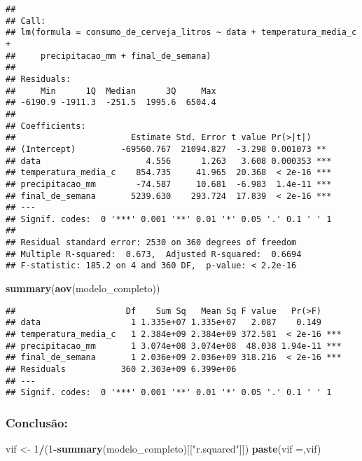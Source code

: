 \documentclass[
]{article}
\newenvironment{Shaded}{\begin{snugshade}}{\end{snugshade}}
\newcommand{\DecValTok}[1]{\textcolor[rgb]{0.00,0.00,0.81}{#1}}
\newcommand{\FunctionTok}[1]{\textcolor[rgb]{0.13,0.29,0.53}{\textbf{#1}}}
\newcommand{\NormalTok}[1]{#1}
\newcommand{\OtherTok}[1]{\textcolor[rgb]{0.56,0.35,0.01}{#1}}
\newcommand{\SpecialCharTok}[1]{\textcolor[rgb]{0.81,0.36,0.00}{\textbf{#1}}}
\newcommand{\StringTok}[1]{\textcolor[rgb]{0.31,0.60,0.02}{#1}}
\begin{document}
\begin{verbatim}
## 
## Call:
## lm(formula = consumo_de_cerveja_litros ~ data + temperatura_media_c + 
##     precipitacao_mm + final_de_semana)
## 
## Residuals:
##     Min      1Q  Median      3Q     Max 
## -6190.9 -1911.3  -251.5  1995.6  6504.4 
## 
## Coefficients:
##                       Estimate Std. Error t value Pr(>|t|)    
## (Intercept)         -69560.767  21094.827  -3.298 0.001073 ** 
## data                     4.556      1.263   3.608 0.000353 ***
## temperatura_media_c    854.735     41.965  20.368  < 2e-16 ***
## precipitacao_mm        -74.587     10.681  -6.983  1.4e-11 ***
## final_de_semana       5239.630    293.724  17.839  < 2e-16 ***
## ---
## Signif. codes:  0 '***' 0.001 '**' 0.01 '*' 0.05 '.' 0.1 ' ' 1
## 
## Residual standard error: 2530 on 360 degrees of freedom
## Multiple R-squared:  0.673,  Adjusted R-squared:  0.6694 
## F-statistic: 185.2 on 4 and 360 DF,  p-value: < 2.2e-16
\end{verbatim}

\begin{Shaded}
\begin{Highlighting}[]
\FunctionTok{summary}\NormalTok{(}\FunctionTok{aov}\NormalTok{(modelo\_completo))}
\end{Highlighting}
\end{Shaded}

\begin{verbatim}
##                      Df    Sum Sq   Mean Sq F value   Pr(>F)    
## data                  1 1.335e+07 1.335e+07   2.087    0.149    
## temperatura_media_c   1 2.384e+09 2.384e+09 372.581  < 2e-16 ***
## precipitacao_mm       1 3.074e+08 3.074e+08  48.038 1.94e-11 ***
## final_de_semana       1 2.036e+09 2.036e+09 318.216  < 2e-16 ***
## Residuals           360 2.303e+09 6.399e+06                     
## ---
## Signif. codes:  0 '***' 0.001 '**' 0.01 '*' 0.05 '.' 0.1 ' ' 1
\end{verbatim}

\hypertarget{conclusuxe3o}{%
\subsubsection{Conclusão:}\label{conclusuxe3o}}

\begin{Shaded}
\begin{Highlighting}[]
\NormalTok{vif }\OtherTok{\textless{}{-}} \DecValTok{1}\SpecialCharTok{/}\NormalTok{(}\DecValTok{1}\SpecialCharTok{{-}}\FunctionTok{summary}\NormalTok{(modelo\_completo)[[}\StringTok{"r.squared"}\NormalTok{]])}
\FunctionTok{paste}\NormalTok{(}\StringTok{\textquotesingle{}vif =\textquotesingle{}}\NormalTok{,vif)}
\end{Highlighting}
\end{Shaded}
\end{document}
